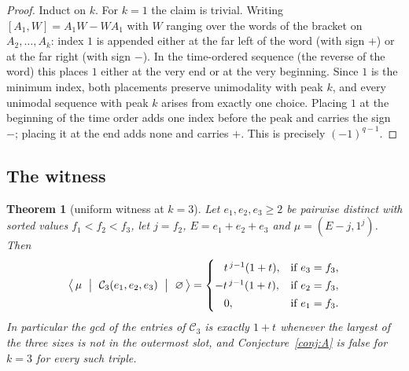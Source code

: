 \documentclass[11pt]{article}
\newtheorem{theorem}{Theorem}
\theoremstyle{definition}
\newcommand{\Ck}{\mathcal{C}}
\begin{document}
\begin{proof}
Induct on $k$. For $k=1$ the claim is trivial. Writing
$[A_1,W]=A_1W-WA_1$ with $W$ ranging over the words of the bracket on $A_2,\dots,A_k$: index $1$
is appended either at the far left of the word (with sign $+$) or at the far right (with sign
$-$). In the time-ordered sequence (the reverse of the word) this places $1$ either at the very
end or at the very beginning. Since $1$ is the minimum index, both placements preserve
unimodality with peak $k$, and every unimodal sequence with peak $k$ arises from exactly one
choice. Placing $1$ at the beginning of the time order adds one index before the peak and
carries the sign $-$; placing it at the end adds none and carries $+$. This is precisely
$(-1)^{q-1}$.
\end{proof}

\subsection{The witness}

\begin{theorem}[uniform witness at $k=3$]\label{thm:wit-k3}
Let $e_1,e_2,e_3\ge2$ be pairwise distinct with sorted values $f_1<f_2<f_3$, let $j=f_2$,
$E=e_1+e_2+e_3$ and $\mu=(E-j,1^j)$. Then
\[
\bigl\langle\,\mu\ \bigm|\ \Ck_3(e_1,e_2,e_3)\ \bigm|\ \varnothing\,\bigr\rangle
=\begin{cases}
\ \ \,t^{\,j-1}(1+t), & \text{if } e_3=f_3,\\[2pt]
-t^{\,j-1}(1+t), & \text{if } e_2=f_3,\\[2pt]
\ \ \,0, & \text{if } e_1=f_3.
\end{cases}
\]
In particular the gcd of the entries of $\Ck_3$ is exactly $1+t$ whenever the largest of the three
sizes is not in the outermost slot, and Conjecture~\ref{conj:A} is false for $k=3$ for every such
triple.
\end{theorem}
\end{document}
